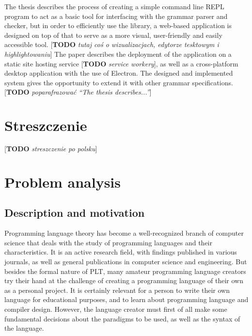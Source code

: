 \documentclass[english,engineering]{wizthesis}
\newcommand{\todo}[1]{{\color{red}[\textbf{TODO} \textit{#1}]}}
\begin{document}
The thesis describes the process of creating a simple command line REPL program
to act as a basic tool for interfacing with the grammar parser and checker, but
in order to efficiently use the library, a web-based application is designed on
top of that to serve as a more visual, user-friendly and easily accessible tool.
\todo{tutaj coś o wizualizacjach, edytorze tesktowym i highlightowaniu} The
paper describes the deployment of the application on a static site hosting
service \todo{service workery}, as well as a cross-platform desktop application
with the use of Electron. The designed and implemented system gives the
opportunity to extend it with other grammar specifications.
\todo{poparafrazować ``The thesis describes...''}

{\let\clearpage\relax %
\chapter*{Streszczenie}

\todo{streszczenie po polsku}
}

\tableofcontents

\mainmatter %

\chapter{Problem analysis}

\section{Description and motivation} \label{sec:description-and-motivation}

Programming language theory has become a well-recognized branch of computer
science that deals with the study of programming languages and their
characteristics. It is an active research field, with findings published in
various journals, as well as general publications in computer science and
engineering. But besides the formal nature of PLT, many amateur programming
language creators try their hand at the challenge of creating a programming
language of their own as a personal project. It is certainly relevant for a
person to write their own language for educational purposes, and to learn about
programming language and compiler design. However, the language creator must
first of all make some fundamental decisions about the paradigms to be used, as
well as the syntax of the language.
\end{document}
